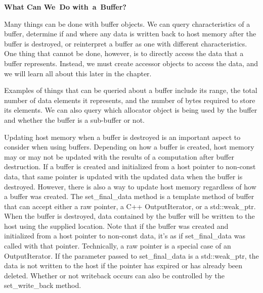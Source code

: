 \hspace*{\fill} \par %
\textbf{What Can We Do with a Buffer?}

Many things can be done with buffer objects. We can query characteristics of a buffer, determine if and where any data is written back to host memory after the buffer is destroyed, or reinterpret a buffer as one with different characteristics. One thing that cannot be done, however, is to directly access the data that a buffer represents. Instead, we must create accessor objects to access the data, and we will learn all about this later in the chapter.\par

Examples of things that can be queried about a buffer include its range, the total number of data elements it represents, and the number of bytes required to store its elements. We can also query which allocator object is being used by the buffer and whether the buffer is a sub-buffer or not.\par

Updating host memory when a buffer is destroyed is an important aspect to consider when using buffers. Depending on how a buffer is created, host memory may or may not be updated with the results of a computation after buffer destruction. If a buffer is created and initialized from a host pointer to non-const data, that same pointer is updated with the updated data when the buffer is destroyed. However, there is also a way to update host memory regardless of how a buffer was created. The set\_final\_data method is a template method of buffer that can accept either a raw pointer, a C++ OutputIterator, or a std::weak\_ptr. When the buffer is destroyed, data contained by the buffer will be written to the host using the supplied location. Note that if the buffer was created and initialized from a host pointer to non-const data, it’s as if set\_final\_data was called with that pointer. Technically, a raw pointer is a special case of an OutputIterator. If the parameter passed to set\_final\_data is a std::weak\_ptr, the data is not written to the host if the pointer has expired or has already been deleted. Whether or not writeback occurs can also be controlled by the set\_write\_back method.\par





























